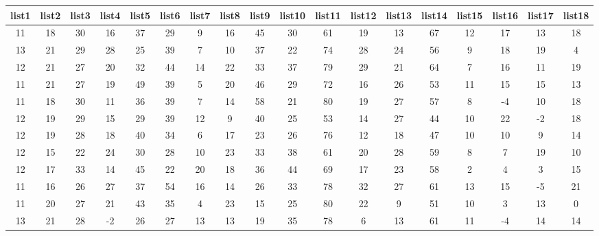 \begin{sidewaystable}
    \centering
\begin{tabular}{cccccccccccccccccc}
list1 & list2 & list3 & list4 & list5 & list6 & list7 & list8 & list9 & list10 & list11 & list12 & list13 & list14 & list15 & list16 & list17 & list18 \\ \hline
    11    & 18    & 30    & 16    & 37    & 29    & 9     & 16    & 45    & 30     & 61     & 19     & 13     & 67     & 12     & 17     & 13     & 18     \\
    13    & 21    & 29    & 28    & 25    & 39    & 7     & 10    & 37    & 22     & 74     & 28     & 24     & 56     & 9      & 18     & 19     & 4      \\
    12    & 21    & 27    & 20    & 32    & 44    & 14    & 22    & 33    & 37     & 79     & 29     & 21     & 64     & 7      & 16     & 11     & 19     \\
    11    & 21    & 27    & 19    & 49    & 39    & 5     & 20    & 46    & 29     & 72     & 16     & 26     & 53     & 11     & 15     & 15     & 13     \\
    11    & 18    & 30    & 11    & 36    & 39    & 7     & 14    & 58    & 21     & 80     & 19     & 27     & 57     & 8      & -4     & 10     & 18     \\
    12    & 19    & 29    & 15    & 29    & 39    & 12    & 9     & 40    & 25     & 53     & 14     & 27     & 44     & 10     & 22     & -2     & 18     \\
    12    & 19    & 28    & 18    & 40    & 34    & 6     & 17    & 23    & 26     & 76     & 12     & 18     & 47     & 10     & 10     & 9      & 14     \\
    12    & 15    & 22    & 24    & 30    & 28    & 10    & 23    & 33    & 38     & 61     & 20     & 28     & 59     & 8      & 7      & 19     & 10     \\
    12    & 17    & 33    & 14    & 45    & 22    & 20    & 18    & 36    & 44     & 69     & 17     & 23     & 58     & 2      & 4      & 3      & 15     \\
    11    & 16    & 26    & 27    & 37    & 54    & 16    & 14    & 26    & 33     & 78     & 32     & 27     & 61     & 13     & 15     & -5     & 21     \\
    11    & 20    & 27    & 21    & 43    & 35    & 4     & 23    & 15    & 25     & 80     & 22     & 9      & 51     & 10     & 3      & 13     & 0      \\
    13    & 21    & 28    & -2    & 26    & 27    & 13    & 13    & 19    & 35     & 78     & 6      & 13     & 61     & 11     & -4     & 14     & 14     \\

\end{tabular}
\end{sidewaystable}
